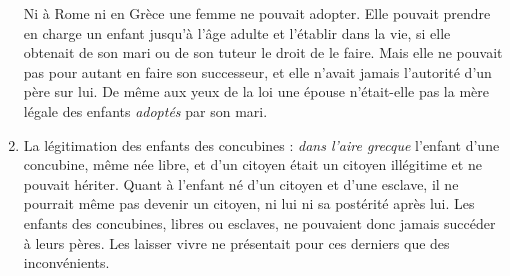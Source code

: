 \begin{enumerate}
Ni à Rome ni en Grèce une femme ne pouvait adopter. Elle pouvait
prendre en charge un enfant jusqu'à l'âge adulte et l'établir dans la
vie, si elle obtenait de son mari ou de son tuteur le droit de le faire. Mais
elle ne pouvait pas pour autant en faire son successeur, et elle n'avait jamais
l'autorité d'un père sur lui. De même aux yeux de la loi une épouse
n'était-elle pas la mère légale des enfants \emph{adoptés} par son mari.
\item La légitimation des enfants des concubines : \emph{dans l'aire grecque}
l'enfant d'une concubine, même née libre, et d'un citoyen était un citoyen
illégitime et ne pouvait hériter. Quant à l'enfant né d'un citoyen et d'une
esclave, il ne pourrait même pas devenir un citoyen, ni lui ni sa postérité
après lui. Les enfants des concubines, libres ou esclaves, ne pouvaient
donc jamais succéder à leurs pères. Les laisser vivre ne présentait pour
ces derniers que des inconvénients.


\end{enumerate}
